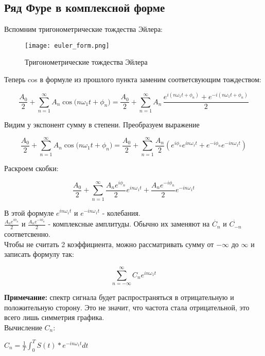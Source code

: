 \subsection*{\textbf{Ряд Фуре в комплексной форме}}

Вспомним тригонометрические тождества Эйлера:

\begin{figure}[H]
    \centering
    \texttt{[image: euler\_form.png]}
    \caption{Тригонометрические тождества Эйлера}
\end{figure}

Теперь cos в формуле из прошлого пункта заменим соответсвующим тождеством:

\[
\frac{A_0}{2} + \sum_{n=1}^{\infty} A_n \cos\!\bigl(n\omega_1 t + \phi_n\bigr)
= \frac{A_0}{2} + \sum_{n=1}^{\infty} A_n \,\frac{e^{i(n\omega_1 t + \phi_n)} + e^{-i(n\omega_1 t + \phi_n)}}{2}
\]

Видим у экспонент сумму в степени. Преобразуем выражение

\[
\frac{A_0}{2} + \sum_{n=1}^{\infty} A_n \cos\!\bigl(n\omega_1 t + \phi_n\bigr)
= \frac{A_0}{2} + \sum_{n=1}^{\infty} 
\frac{A_n}{2}\left(e^{i\phi_n} e^{i n\omega_1 t} + e^{-i\phi_n} e^{-i n\omega_1 t}\right)
\]

Раскроем скобки:

\[
\frac{A_0}{2} + \sum_{n=1}^{\infty} 
\frac{A_ne^{i\phi_n}}{2} e^{i n\omega_1 t} 
+ \frac{A_ne^{-i\phi_n}}{2} e^{-i n\omega_1 t}
\]

В этой формуле $e^{i n\omega_1 t}$ и $e^{-i n\omega_1 t}$ - колебания. \\

$\frac{A_ne^{i\phi_n}}{2}$ и $\frac{A_ne^{-i\phi_n}}{2}$ - комплексные амплитуды.
Обычно их заменяют на $\dot{C_n}$ и $\dot{C_{-n}}$ соответсвенно. \\

Чтобы не считать 2 коэффициента, можно рассматривать сумму от $-\infty$ до $\infty$ и записать формулу так:

$$\sum_{n=-\infty}^{\infty} C_ne^{in\omega_1t}$$

\textbf{Примечание:} спектр сигнала будет распространяться в отрицательную и положительную сторону. Это не значит, что частота
стала отрицательной, это всего лишь симметрия графика.\\

Вычисление $C_n$:

$C_n = \frac{1}{T}\int_{0}^{T}S(t)*e^{-in\omega_1t}dt$ \\

